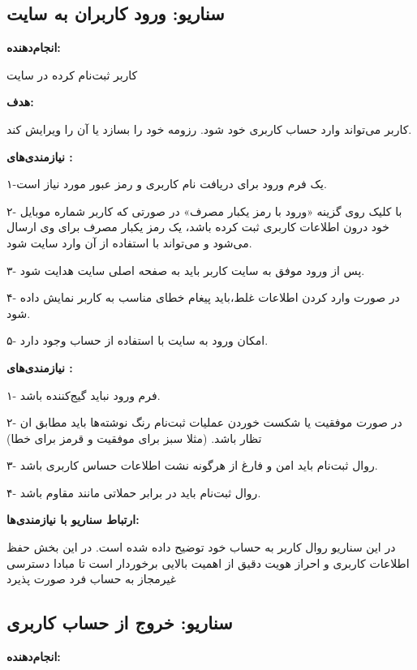 \documentclass[]{article}
\begin{document}
	
	\subsection{\LARGE{سناریو: ورود کاربران به سایت}}
	
	\textbf{انجام‌دهنده:}
	
	کاربر ثبت‌نام کرده در سایت
	
	\textbf{هدف:}
	
	کاربر می‌تواند وارد حساب کاربری خود شود. رزومه خود را بسازد یا آن را ویرایش کند.
	
	
	
	
	
	\textbf{نیازمندی‌های :} 
	
	۱-یک فرم ورود برای دریافت نام کاربری و رمز عبور مورد نیاز است.
	
	۲- با کلیک روی گزینه «ورود با رمز یکبار مصرف» در صورتی که کاربر شماره موبایل خود درون اطلاعات کاربری ثبت‌ کرده باشد،‌ یک رمز یکبار مصرف برای وی ارسال می‌شود و می‌تواند با استفاده از آن وارد سایت شود.
	
	۳- پس از ورود موفق به سایت کاربر باید به صفحه اصلی سایت هدایت شود.
	
	۴- در صورت وارد کردن اطلاعات غلط،‌باید پیغام خطای مناسب به کاربر نمایش داده شود.
	
	۵- امکان ورود به سایت با استفاده از حساب  وجود دارد.
	
	\textbf{نیازمندی‌های :}
	
	۱- فرم ورود نباید گیج‌کننده باشد.
	
	۲- در صورت موفقیت یا شکست خوردن عملیات ثبت‌نام رنگ نوشته‌ها باید مطابق ان
	تظار باشد. (مثلا سبز برای موفقیت و قرمز برای خطا)
	
	۳- روال ثبت‌نام باید امن و فارغ از هرگونه نشت اطلاعات حساس کاربری باشد.
	
	۴- روال ثبت‌نام باید در برابر حملاتی مانند  مقاوم باشد.
	
	
	\textbf{ارتباط سناریو با نیازمندی‌ها:}
	
	در  این سناریو روال کاربر به حساب خود توضیح داده شده است. در این بخش حفظ اطلاعات کاربری و احراز هویت دقیق از اهمیت بالایی برخوردار است تا مبادا دسترسی غیرمجاز به حساب فرد صورت پذیرد
	
	
	\subsection{\LARGE{سناریو: خروج از حساب کاربری}}
	
	\textbf{انجام‌دهنده:}
	
\end{document}
